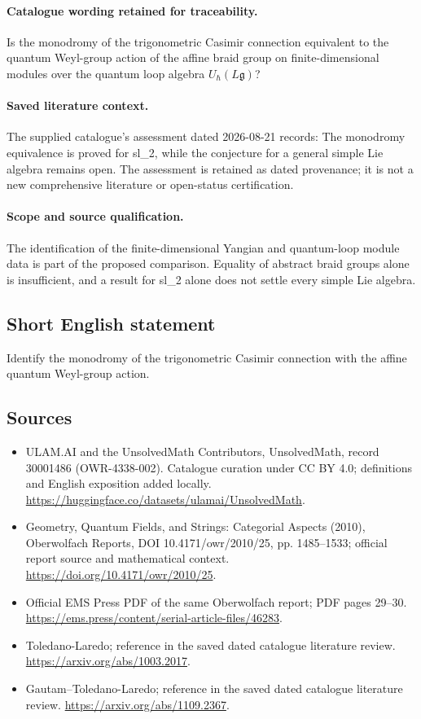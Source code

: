 \documentclass[11pt]{article}
\begin{document}
\paragraph{Catalogue wording retained for traceability.}
Is the monodromy of the trigonometric Casimir connection equivalent to the quantum Weyl-group action of the affine braid group on finite-dimensional modules over the quantum loop algebra $U_{\hbar}(L\mathfrak g)$?

\paragraph{Saved literature context.} The supplied catalogue's assessment dated 2026-08-21 records: The monodromy equivalence is proved for sl\_2, while the conjecture for a general simple Lie algebra remains open. The assessment is retained as dated provenance; it is not a new comprehensive literature or open-status certification.
\paragraph{Scope and source qualification.}The identification of the finite-dimensional Yangian and quantum-loop module data is part of the proposed comparison. Equality of abstract braid groups alone is insufficient, and a result for sl_2 alone does not settle every simple Lie algebra.
\subsection{Short English statement}
Identify the monodromy of the trigonometric Casimir connection with the affine quantum Weyl-group action.
\subsection{Sources}
\begin{itemize}
\item[\hypertarget{source:30001486:1}{S1}] ULAM.AI and the UnsolvedMath Contributors, UnsolvedMath, record 30001486 (OWR-4338-002). Catalogue curation under CC BY 4.0; definitions and English exposition added locally.
\url{https://huggingface.co/datasets/ulamai/UnsolvedMath}.
\item[\hypertarget{source:30001486:2}{S2}] Geometry, Quantum Fields, and Strings: Categorial Aspects (2010), Oberwolfach Reports, DOI 10.4171/owr/2010/25, pp. 1485--1533; official report source and mathematical context.
\url{https://doi.org/10.4171/owr/2010/25}.
\item[\hypertarget{source:30001486:3}{S3}] Official EMS Press PDF of the same Oberwolfach report; PDF pages 29--30.
\url{https://ems.press/content/serial-article-files/46283}.
\item[\hypertarget{source:30001486:4}{S4}] Toledano-Laredo; reference in the saved dated catalogue literature review.
\url{https://arxiv.org/abs/1003.2017}.
\item[\hypertarget{source:30001486:5}{S5}] Gautam--Toledano-Laredo; reference in the saved dated catalogue literature review.
\url{https://arxiv.org/abs/1109.2367}.
\end{itemize}
\label{end:30001486}
\end{document}
